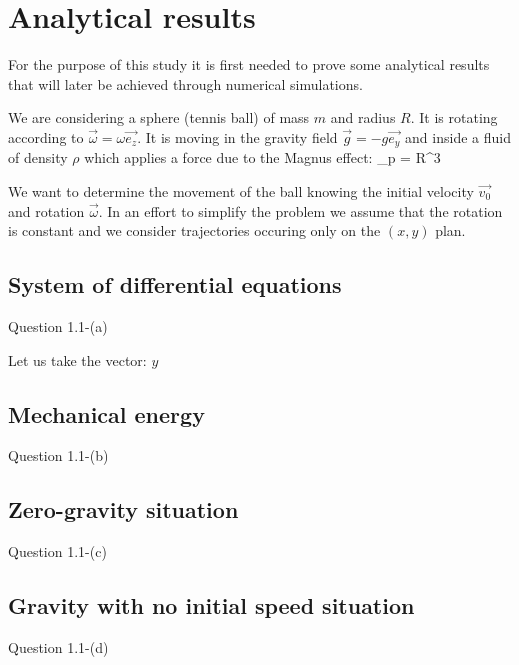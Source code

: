 \section{Analytical results}

For the purpose of this study it is first needed to prove some analytical results that will later be achieved through numerical simulations.

We are considering a sphere (tennis ball) of mass $m$ and radius $R$. It is rotating according to $\vec{\omega} = \omega \vec{e_z}$. It is moving in the gravity field $\vec{g} = -g\vec{e_y}$ and inside a fluid of density $\rho$ which applies a force due to the Magnus effect:
\be
    _p = \mu R^3 \rho \vec{\omega} \times {}
\ee

We want to determine the movement of the ball knowing the initial velocity $\vec{v_0}$ and rotation $\vec{\omega}$. In an effort to simplify the problem we assume that the rotation is constant and we consider trajectories occuring only on the $(x,y)$ plan.


\subsection{System of differential equations}
Question 1.1-(a)

Let us take the vector: $y$


\subsection{Mechanical energy}
Question 1.1-(b)



\subsection{Zero-gravity situation}
Question 1.1-(c)



\subsection{Gravity with no initial speed situation}
Question 1.1-(d)


